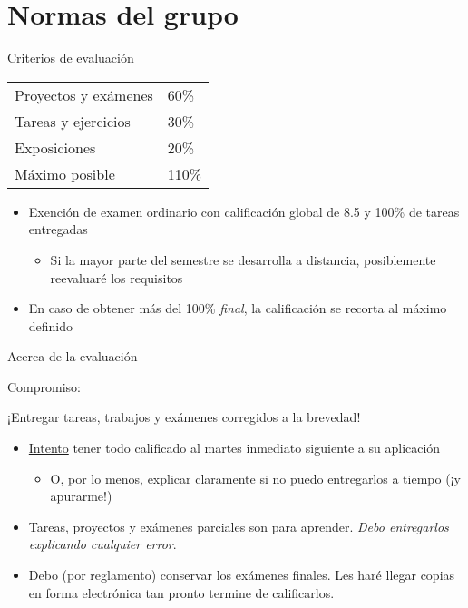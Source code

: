 \documentclass[presentation]{beamer}
\begin{document}
\section{Normas del grupo}
\label{sec:orga36a6b3}
\begin{frame}[label={sec:orgb109a5a}]{Criterios de evaluación}
\begin{center}
\begin{tabular}{ll}
\hline
Proyectos y exámenes & 60\%\\
Tareas y ejercicios & 30\%\\
Exposiciones & 20\%\\
\hline
Máximo posible & 110\%\\
\hline
\end{tabular}
\end{center}
\begin{itemize}
\item Exención de examen ordinario con calificación global de 8.5 y 100\%
de tareas entregadas
\begin{itemize}
\item Si la mayor parte del semestre se desarrolla a distancia,
posiblemente reevaluaré los requisitos
\end{itemize}
\item En caso de obtener más del 100\% \emph{final}, la calificación se recorta
al máximo definido
\end{itemize}
\end{frame}

\begin{frame}[label={sec:org98d8929}]{Acerca de la evaluación}
\begin{center}
Compromiso:

¡Entregar tareas, trabajos y exámenes corregidos a la brevedad!
\end{center}
\begin{itemize}
\item \uline{Intento} tener todo calificado al martes inmediato siguiente a su
aplicación
\begin{itemize}
\item O, por lo menos, explicar claramente si no puedo entregarlos a
tiempo (¡y apurarme!)
\end{itemize}
\item Tareas, proyectos y exámenes parciales son para aprender. \emph{Debo
entregarlos explicando cualquier error}.
\item Debo (por reglamento) conservar los exámenes finales. Les haré
llegar copias en forma electrónica tan pronto termine de
calificarlos.
\end{itemize}
\end{frame}
\end{document}
